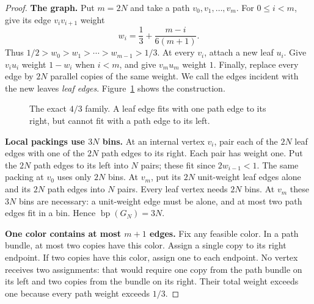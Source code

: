 \documentclass[11pt]{article}
\theoremstyle{definition}\newtheorem{algorithm}{Algorithm}[section]
\numberwithin{equation}{section}
\theoremstyle{remark}\newtheorem*{remark}{Remark}
\newcommand{\bp}{\operatorname{bp}}
\begin{document}
\begin{proof}
\textbf{The graph.}
Put $m=2N$ and take a path $v_0,v_1,\ldots,v_m$.
For $0\le i<m$, give its edge $v_iv_{i+1}$ weight
\[
 w_i=\frac13+\frac{m-i}{6(m+1)}.
\]
Thus $1/2>w_0>w_1>\cdots>w_{m-1}>1/3$.
At every $v_i$, attach a new leaf $u_i$. Give $v_iu_i$ weight
$1-w_i$ when $i<m$, and give $v_mu_m$ weight $1$.
Finally, replace every edge by $2N$ parallel copies of the same weight.
We call the edges incident with the new leaves \emph{leaf edges}.
Figure~\ref{fig:bp-four-thirds} shows the construction.

\begin{figure}[htbp]
\centering
{}
\caption{The exact $4/3$ family. A leaf edge fits with one path edge
to its right, but cannot fit with a path edge to its left.}
\label{fig:bp-four-thirds}
\end{figure}

\textbf{Local packings use $3N$ bins.}
At an internal vertex $v_i$, pair each of the $2N$ leaf edges with
one of the $2N$ path edges to its right. Each pair has weight one.
Put the $2N$ path edges to its left into $N$ pairs; these fit since
$2w_{i-1}<1$. The same packing at $v_0$ uses only $2N$ bins.
At $v_m$, put its $2N$ unit-weight leaf edges alone and its $2N$
path edges into $N$ pairs. Every leaf vertex needs $2N$ bins.
At $v_m$ these $3N$ bins are necessary: a unit-weight edge must be
alone, and at most two path edges fit in a bin. Hence $\bp(G_N)=3N$.

\textbf{One color contains at most $m+1$ edges.}
Fix any feasible color. In a path bundle, at most two copies have
this color. Assign a single copy to its right endpoint. If two copies
have this color, assign one to each endpoint.
No vertex receives two assignments: that would require one copy from
the path bundle on its left and two copies from the bundle on its right.
Their total weight exceeds one because every path weight exceeds $1/3$.


\end{proof}
\end{document}
